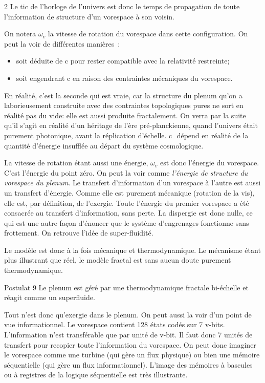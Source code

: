 \begin{multicols}{2}
Le tic de l'horloge de l'univers est donc le temps de propagation de
toute l'information de structure d'un vorespace à son voisin.

On notera $\omega_v$ la vitesse de rotation du vorespace dans cette
configuration. On peut la voir de différentes manières :

\begin{itemize}
	\item soit déduite de c pour rester compatible avec la relativité
	restreinte;
	\item soit engendrant c en raison des contraintes mécaniques du
	vorespace.
\end{itemize}

En réalité, c'est la seconde qui est vraie, car la structure du plenum
qu'on a laborieusement construite avec des contraintes topologiques
pures ne sort en réalité pas du vide: elle est aussi produite
fractalement. On verra par la suite qu'il s'agit en réalité d'un
héritage de l'ère pré-planckienne, quand l'univers était purement
photonique, avant la réplication d'échelle. c\,~dépend en réalité de
la quantité d'énergie insufflée au départ du système cosmologique.
\medskip

La vitesse de rotation étant aussi une énergie, $\omega_v$ est donc 
l'énergie du vorespace. C'est l'énergie du point zéro. On peut 
la voir comme \textit{l'énergie de structure du vorespace du plenum}.
Le transfert d'information d'un vorespace à l'autre est aussi un
transfert d'énergie. Comme elle est purement mécanique (rotation de la
vis), elle est, par définition, de l'exergie. Toute l'énergie du
premier vorespace a été consacrée au transfert d'information, sans
perte. La dispergie est donc nulle, ce qui est une autre façon
d'énoncer que le système d'engrenages fonctionne sans frottement. On
retrouve l'idée de super-fluidité.

Le modèle est donc à la fois mécanique et thermodynamique. Le
mécanisme étant plus illustrant que réel, le modèle fractal est sans
aucun doute purement thermodynamique.

\begin{mybox}[breakable,colback=blue!10, colbacktitle=pkcolor]{Postulat 9}
Le plenum est géré par une thermodynamique fractale bi-échelle et
réagit comme un superfluide.
\end{mybox}
\medskip

Tout n'est donc qu'exergie dans le plenum. On peut aussi la voir d'un
point de vue informationnel. Le vorespace contient 128 états codés sur
7 v-bits. L'information n'est transférable que par unité de v-bit. Il
faut donc 7 unités de transfert pour recopier toute l'information du
vorespace. On peut donc imaginer le vorespace comme une turbine (qui
gère un flux physique) ou bien une mémoire séquentielle (qui gère un flux
informationnel). L'image des mémoires à bascules ou à registres de la
logique séquentielle est très illustrante.
\medskip


\end{multicols}
